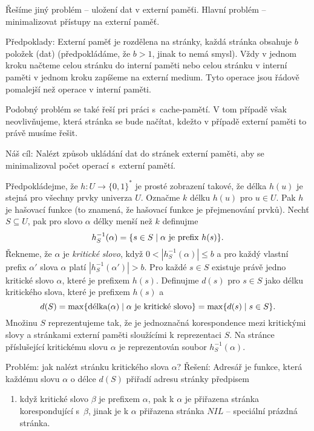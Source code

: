\documentclass[a4paper,12pt]{article}
\begin{document}
Řešíme jiný problém -- uložení dat v externí 
paměťi. Hlavní problém -- minimalizovat přístupy na 
externí paměť. 

Předpoklady:  Ex\-ter\-ní pa\-měť je roz\-dě\-le\-na na 
strán\-ky, kaž\-dá strán\-ka ob\-sa\-hu\-je $b$ po\-lo\-žek (dat) 
(předpokládáme, že $b>1$, jinak to nemá smysl).  Vždy v 
jednom kroku načteme celou stránku do interní paměti 
nebo celou stránku v interní paměti v jednom kroku 
zapíšeme na externí medium.  Tyto operace jsou řádově 
pomalejší než operace v interní paměti.  

Podobný problém se také řeší pri práci s~cache-pamětí. V tom případě však 
neovlivňujeme, která stránka se bude načítat, kdežto v případě externí paměti to právě musíme řešit.

Náš cíl:  
Nalézt způsob ukládání dat do stránek externí 
paměti, aby se minimalizoval počet operací s~externí 
pamětí.  

Předpokládejme, že $h:U\to \{0,1\}^{*}$ je prosté 
zobrazení takové, že délka $h(u)$ je stejná pro všechny prvky 
univerza $U$.  Označme $k$ délku $h(u)$ pro $u\in U$. Pak $
h$ je 
hašovací funkce (to znamená, že hašovací funkce je přejmenování prvků).  Nechť $S\subseteq U$, pak pro slovo $
\alpha$ délky 
menší než $k$ definujme 
$$h^{-1}_S(\alpha )=\{s\in S\mid\alpha\text{\rm\ je prefix }h(s)\}
.$$
Řekneme, že $\alpha$ je \emph{kritické} \emph{slovo}, když 
$0<|h^{-1}_S(\alpha )|\le b$ a pro každý vlastní prefix $
\alpha'$ slova $\alpha$ platí 
$|h^{-1}_S(\alpha')|>b$.  Pro každé $s\in S$ existuje právě jedno 
kritické slovo $\alpha$, které je prefixem $h(s)$.  Definujme $
d(s)$ 
pro $s\in S$ jako délku kritického slova, které je prefixem 
$h(s)$ a 
$$d(S)=\max\{\text{\rm délka}(\alpha )\mid\alpha\text{\rm\ je kritické slovo}
\}=\max\{d(s)\mid s\in S\}.$$
Množinu $S$ reprezentujeme tak, že je jednoznačná 
korespondence mezi kritickými slovy a stránkami externí 
paměti slouží\-cí\-mi k reprezentaci $S$.  Na stránce 
příslušející kritickému slovu $\alpha$ je reprezentován soubor 
$h^{-1}_S(\alpha )$.  

Problém: jak nalézt stránku kritického slova 
$\alpha$?\newline 
Řešení: Adresář je funkce, která každému slovu $
\alpha$ o 
délce $d(S)$ přiřadí adresu stránky předpisem
\begin{enumerate}
\item když kritické slovo $\beta$ je prefixem $\alpha$, pak k $
\alpha$ je 
přiřazena strán\-ka korespondující s~$\beta$, jinak je k $
\alpha$ 
přiřazena strán\-ka $NIL$ -- speciální prázdná stránka.
\end{enumerate}
\end{document}
